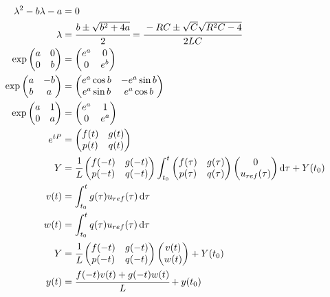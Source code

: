 \documentclass[12pt]{article}
\begin{document}
\begin{align}
\lambda^2 - b\lambda - a &= 0 \\
\lambda &= \cfrac{b \pm \sqrt{b^2 + 4a}}{2} = \cfrac{-RC \pm \sqrt{C}\sqrt{R^2 C - 4}}{2LC} \\
\exp \begin{pmatrix} a & 0 \\ 0 & b \end{pmatrix} &= \begin{pmatrix} e^a & 0 \\ 0 & e^b \end{pmatrix} \\
\exp \begin{pmatrix} a & -b \\ b & a \end{pmatrix} &= \begin{pmatrix} e^a\cos b & -e^a \sin b \\ e^a \sin b & e^a \cos b \end{pmatrix} \\
\exp \begin{pmatrix} a & 1 \\ 0 & a \end{pmatrix} &= \begin{pmatrix} e^a & 1 \\ 0 & e^a \end{pmatrix} \\
e^{tP} &= \begin{pmatrix} f(t) & g(t) \\ p(t) & q(t) \end{pmatrix} \\
 Y &= \cfrac{1}{L} \begin{pmatrix} f(-t) & g(-t) \\ p(-t) & q(-t) \end{pmatrix} \int_{t_0}^t \begin{pmatrix} f(\tau) & g(\tau) \\ p(\tau) & q(\tau) \end{pmatrix} \begin{pmatrix} 0 \\ u_{ref}(\tau) \end{pmatrix} \mathrm{d}\tau + Y(t_0) \\
 v(t) &= \int_{t_0}^t g(\tau) u_{ref}(\tau) \,\mathrm{d}\tau \\
 w(t) &= \int_{t_0}^t q(\tau) u_{ref}(\tau) \,\mathrm{d}\tau \\
 Y &= \cfrac{1}{L} \begin{pmatrix} f(-t) & g(-t) \\ p(-t) & q(-t) \end{pmatrix}  \begin{pmatrix} v(t) \\ w(t) \end{pmatrix} + Y(t_0) \\
 y(t) &= \cfrac{f(-t)v(t) + g(-t)w(t)}{L}  + y(t_0)
\end{align}
\end{document}
